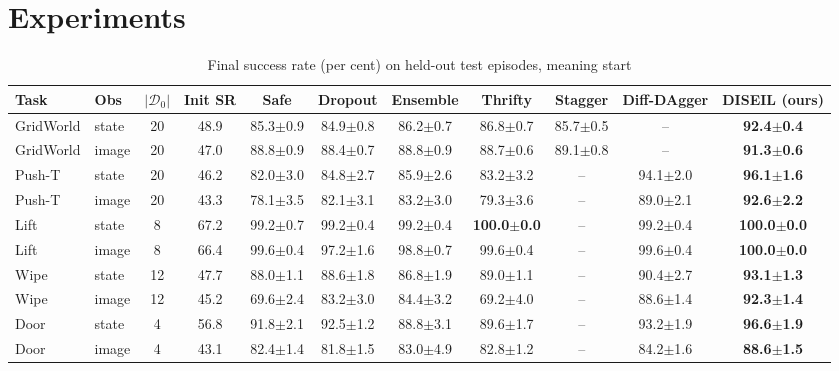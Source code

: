 
\section{Experiments}

\begin{table}[t]
\centering
\footnotesize
\begin{tabular}{llcc ccccccc}
\toprule
Task & Obs & $|\mathcal{D}_0|$ & Init SR & Safe & Dropout & Ensemble & Thrifty & Stagger & Diff-DAgger & DISEIL (ours) \\
\midrule
GridWorld & state & 20 & 48.9 & 85.3$\pm$0.9 & 84.9$\pm$0.8 & 86.2$\pm$0.7 & 86.8$\pm$0.7 & 85.7$\pm$0.5 & -- & \textbf{92.4$\pm$0.4} \\
GridWorld & image & 20 & 47.0 & 88.8$\pm$0.9 & 88.4$\pm$0.7 & 88.8$\pm$0.9 & 88.7$\pm$0.6 & 89.1$\pm$0.8 & -- & \textbf{91.3$\pm$0.6} \\
Push-T & state & 20 & 46.2 & 82.0$\pm$3.0 & 84.8$\pm$2.7 & 85.9$\pm$2.6 & 83.2$\pm$3.2 & -- & 94.1$\pm$2.0 & \textbf{96.1$\pm$1.6} \\
Push-T & image & 20 & 43.3 & 78.1$\pm$3.5 & 82.1$\pm$3.1 & 83.2$\pm$3.0 & 79.3$\pm$3.6 & -- & 89.0$\pm$2.1 & \textbf{92.6$\pm$2.2} \\
Lift & state & 8 & 67.2 & 99.2$\pm$0.7 & 99.2$\pm$0.4 & 99.2$\pm$0.4 & \textbf{100.0$\pm$0.0} & -- & 99.2$\pm$0.4 & \textbf{100.0$\pm$0.0} \\
Lift & image & 8 & 66.4 & 99.6$\pm$0.4 & 97.2$\pm$1.6 & 98.8$\pm$0.7 & 99.6$\pm$0.4 & -- & 99.6$\pm$0.4 & \textbf{100.0$\pm$0.0} \\
Wipe & state & 12 & 47.7 & 88.0$\pm$1.1 & 88.6$\pm$1.8 & 86.8$\pm$1.9 & 89.0$\pm$1.1 & -- & 90.4$\pm$2.7 & \textbf{93.1$\pm$1.3} \\
Wipe & image & 12 & 45.2 & 69.6$\pm$2.4 & 83.2$\pm$3.0 & 84.4$\pm$3.2 & 69.2$\pm$4.0 & -- & 88.6$\pm$1.4 & \textbf{92.3$\pm$1.4} \\
Door & state & 4 & 56.8 & 91.8$\pm$2.1 & 92.5$\pm$1.2 & 88.8$\pm$3.1 & 89.6$\pm$1.7 & -- & 93.2$\pm$1.9 & \textbf{96.6$\pm$1.9} \\
Door & image & 4 & 43.1 & 82.4$\pm$1.4 & 81.8$\pm$1.5 & 83.0$\pm$4.9 & 82.8$\pm$1.2 & -- & 84.2$\pm$1.6 & \textbf{88.6$\pm$1.5} \\
\bottomrule
\end{tabular}
\caption{Final success rate (per cent) on held-out test episodes, meaning start
}
\end{table}
